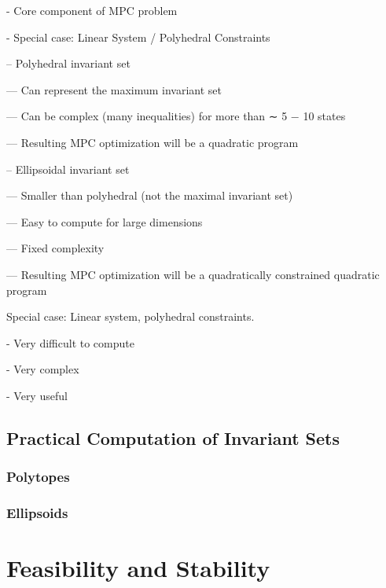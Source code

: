 - Core component of MPC problem

- Special case: Linear System / Polyhedral Constraints

-- Polyhedral invariant set

--- Can represent the maximum invariant set

--- Can be complex (many inequalities) for more than ∼ 5 − 10 states

--- Resulting MPC optimization will be a quadratic program

-- Ellipsoidal invariant set

--- Smaller than polyhedral (not the maximal invariant set)

--- Easy to compute for large dimensions

--- Fixed complexity

--- Resulting MPC optimization will be a
quadratically constrained quadratic program

Special case: Linear system, polyhedral constraints.

- Very difficult to compute

- Very complex

- Very useful

\subsection{Practical Computation of Invariant Sets}

\subsubsection{Polytopes}
\subsubsection{Ellipsoids}


\section{Feasibility and Stability}



